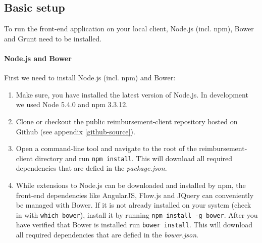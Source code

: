 \subsection{Basic setup}
To run the front-end application on your local client, Node.js (incl. npm), Bower and Grunt need to be installed.

\paragraph{Node.js and Bower}
First we need to install Node.js (incl. npm) and Bower:
\begin{enumerate}
  \item Make sure, you have installed the latest version of Node.js. In development we used Node 5.4.0 and npm 3.3.12.
  \item Clone or checkout the public reimbursement-client repository hosted on Github (see appendix \ref{github-source}).
  \item Open a command-line tool and navigate to the root of the reimbursement-client directory and run \texttt{npm install}. This will download all required dependencies that are defied in the \textit{package.json}.
  \item While extensions to Node.js can be downloaded and installed by npm, the front-end dependencies like AngularJS, Flow.js and JQuery can conveniently be managed with Bower. If it is not already installed on your system (check in with \texttt{which bower}), install it by running \texttt{npm install -g bower}. After you have verified that Bower is installed run \texttt{bower install}. This will download all required dependencies that are defied in the \textit{bower.json}.
\end{enumerate}

